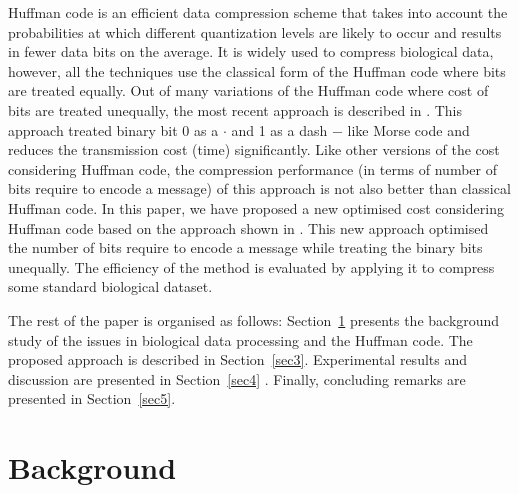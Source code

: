 \documentclass[preprint,12pt]{elsarticle}
\begin{document}
Huffman code is an efficient data compression scheme that takes into account the probabilities at which different quantization levels are likely to occur and results in fewer data bits on the average. It is widely used to compress biological data, however, all the techniques use the classical form of the Huffman code where bits are treated equally. Out of many variations of the Huffman code where cost of bits are treated unequally, the most recent approach is described in \cite{Kab14}. This approach treated binary bit 0 as a $\cdot$ and 1 as a dash $-$ like Morse code and reduces the transmission cost (time) significantly. Like other versions of the cost considering Huffman code, the compression performance (in terms of number of bits require to encode a message) of this approach is not also better than classical Huffman code. In this paper, we have proposed a new optimised cost considering Huffman code based on the approach shown in \cite{Kab14}. This new approach optimised the number of bits require to encode a message while treating the binary bits unequally. The efficiency of the method is evaluated by applying it to compress some standard biological dataset.         

The rest of the paper is organised as follows: Section~\ref{sec2} presents the background study of the issues in biological data processing and the Huffman code. The proposed approach is described in Section~\ref{sec3}. Experimental results and discussion are presented in Section~\ref{sec4} . Finally, concluding remarks are presented in Section~\ref{sec5}.

\label{sec1}

\section{Background}
\label{sec2}
\end{document}
